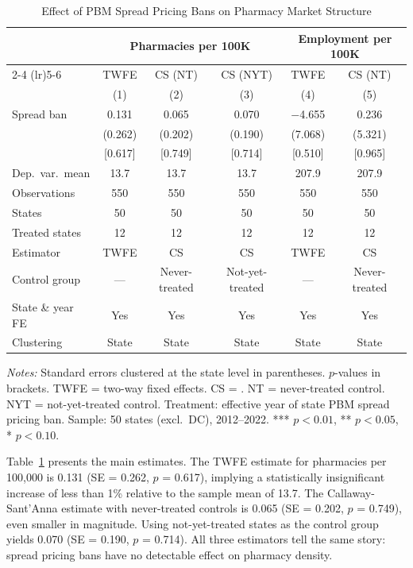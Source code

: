 \documentclass[12pt]{article}
\begin{document}
\begin{table}[htbp]
\centering
\caption{Effect of PBM Spread Pricing Bans on Pharmacy Market Structure}
\label{tab:main}
\begin{threeparttable}
\begin{tabular}{lccccc}
\toprule
 & \multicolumn{3}{c}{Pharmacies per 100K} & \multicolumn{2}{c}{Employment per 100K} \\
\cmidrule(lr){2-4} \cmidrule(lr){5-6}
 & TWFE & CS (NT) & CS (NYT) & TWFE & CS (NT) \\
 & (1) & (2) & (3) & (4) & (5) \\
\midrule
Spread ban & 0.131 & 0.065 & 0.070 & $-$4.655 & 0.236 \\
 & (0.262) & (0.202) & (0.190) & (7.068) & (5.321) \\
 & [0.617] & [0.749] & [0.714] & [0.510] & [0.965] \\
\midrule
Dep.\ var.\ mean & 13.7 & 13.7 & 13.7 & 207.9 & 207.9 \\
Observations & 550 & 550 & 550 & 550 & 550 \\
States & 50 & 50 & 50 & 50 & 50 \\
Treated states & 12 & 12 & 12 & 12 & 12 \\
Estimator & TWFE & CS & CS & TWFE & CS \\
Control group & --- & Never-treated & Not-yet-treated & --- & Never-treated \\
State \& year FE & Yes & Yes & Yes & Yes & Yes \\
Clustering & State & State & State & State & State \\
\bottomrule
\end{tabular}
\begin{tablenotes}[flushleft]\small
\item \textit{Notes:} Standard errors clustered at the state level in parentheses. $p$-values in brackets. TWFE = two-way fixed effects. CS = \citet{callaway2021difference}. NT = never-treated control. NYT = not-yet-treated control. Treatment: effective year of state PBM spread pricing ban. Sample: 50 states (excl.\ DC), 2012--2022. *** $p<0.01$, ** $p<0.05$, * $p<0.10$.
\end{tablenotes}
\end{threeparttable}
\end{table}

Table~\ref{tab:main} presents the main estimates. The TWFE estimate for pharmacies per 100,000 is 0.131 (SE = 0.262, $p$ = 0.617), implying a statistically insignificant increase of less than 1\% relative to the sample mean of 13.7. The Callaway-Sant'Anna estimate with never-treated controls is 0.065 (SE = 0.202, $p$ = 0.749), even smaller in magnitude. Using not-yet-treated states as the control group yields 0.070 (SE = 0.190, $p$ = 0.714). All three estimators tell the same story: spread pricing bans have no detectable effect on pharmacy density.
\end{document}
